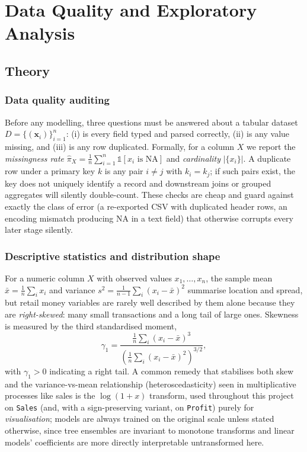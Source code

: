 \chapter{Data Quality and Exploratory Analysis}
\label{ch:eda}

\section{Theory}

\subsection{Data quality auditing}
Before any modelling, three questions must be answered about a tabular
dataset $D = \{(\mathbf{x}_i)\}_{i=1}^n$: (i) is every field typed and
parsed correctly, (ii) is any value missing, and (iii) is any row
duplicated. Formally, for a column $X$ we report the \emph{missingness
rate} $\hat\pi_X = \frac{1}{n}\sum_{i=1}^n \mathbb{1}[x_{i} \text{ is
NA}]$ and \emph{cardinality} $|\{x_i\}|$. A duplicate row under a primary
key $k$ is any pair $i \neq j$ with $k_i = k_j$; if such pairs exist, the
key does not uniquely identify a record and downstream joins or grouped
aggregates will silently double-count. These checks are cheap and
guard against exactly the class of error (a re-exported CSV with
duplicated header rows, an encoding mismatch producing NA in a text field)
that otherwise corrupts every later stage silently.

\subsection{Descriptive statistics and distribution shape}
For a numeric column $X$ with observed values $x_1,\dots,x_n$, the sample
mean $\bar x = \frac1n\sum_i x_i$ and variance
$s^2 = \frac{1}{n-1}\sum_i (x_i-\bar x)^2$ summarise location and spread,
but retail money variables are rarely well described by them alone because
they are \emph{right-skewed}: many small transactions and a long tail of
large ones. Skewness is measured by the third standardised moment,
\begin{equation}
  \gamma_1 = \frac{\frac1n\sum_i (x_i - \bar x)^3}{\left(\frac1n\sum_i (x_i-\bar x)^2\right)^{3/2}},
  \label{eq:skew}
\end{equation}
with $\gamma_1 > 0$ indicating a right tail. A common remedy that
stabilises both skew and the variance-vs-mean relationship
(heteroscedasticity) seen in multiplicative processes like sales is the
$\log(1+x)$ transform, used throughout this project on \texttt{Sales}
(and, with a sign-preserving variant, on \texttt{Profit}) purely for
\emph{visualisation}; models are always trained on the original scale
unless stated otherwise, since tree ensembles are invariant to monotone
transforms and linear models' coefficients are more directly interpretable
untransformed here.

